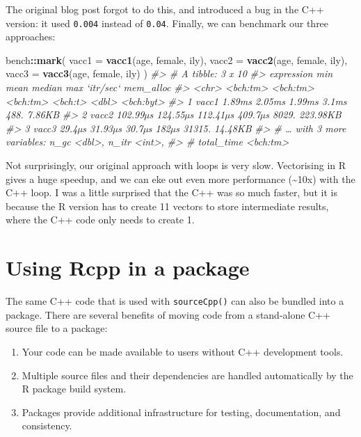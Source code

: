 \documentclass[]{book}
\newenvironment{Shaded}{\begin{snugshade}}{\end{snugshade}}
\newcommand{\CommentTok}[1]{\textcolor[rgb]{0.37,0.37,0.37}{\textit{#1}}}
\newcommand{\DataTypeTok}[1]{\textcolor[rgb]{0.27,0.27,0.27}{#1}}
\newcommand{\KeywordTok}[1]{\textcolor[rgb]{0.27,0.27,0.27}{\textbf{#1}}}
\newcommand{\NormalTok}[1]{#1}
\newcommand{\OperatorTok}[1]{\textcolor[rgb]{0.43,0.43,0.43}{\textbf{#1}}}
\begin{document}
The original blog post forgot to do this, and introduced a bug in the C++ version: it used \texttt{0.004} instead of \texttt{0.04}. Finally, we can benchmark our three approaches:

\begin{Shaded}
\begin{Highlighting}[]
\NormalTok{bench}\OperatorTok{::}\KeywordTok{mark}\NormalTok{(}
  \DataTypeTok{vacc1 =} \KeywordTok{vacc1}\NormalTok{(age, female, ily),}
  \DataTypeTok{vacc2 =} \KeywordTok{vacc2}\NormalTok{(age, female, ily),}
  \DataTypeTok{vacc3 =} \KeywordTok{vacc3}\NormalTok{(age, female, ily)}
\NormalTok{)}
\CommentTok{#> # A tibble: 3 x 10}
\CommentTok{#>   expression      min     mean   median     max `itr/sec` mem_alloc}
\CommentTok{#>   <chr>      <bch:tm> <bch:tm> <bch:tm> <bch:t>     <dbl> <bch:byt>}
\CommentTok{#> 1 vacc1        1.89ms   2.05ms   1.99ms   3.1ms      488.    7.86KB}
\CommentTok{#> 2 vacc2      102.99µs 124.55µs 112.41µs 409.7µs     8029.  223.98KB}
\CommentTok{#> 3 vacc3        29.4µs  31.93µs   30.7µs   182µs    31315.   14.48KB}
\CommentTok{#> # … with 3 more variables: n_gc <dbl>, n_itr <int>,}
\CommentTok{#> #   total_time <bch:tm>}
\end{Highlighting}
\end{Shaded}

Not surprisingly, our original approach with loops is very slow. Vectorising in R gives a huge speedup, and we can eke out even more performance (\textasciitilde{}10x) with the C++ loop. I was a little surprised that the C++ was so much faster, but it is because the R version has to create 11 vectors to store intermediate results, where the C++ code only needs to create 1.

\hypertarget{rcpp-package}{%
\section{Using Rcpp in a package}\label{rcpp-package}}

The same C++ code that is used with \texttt{sourceCpp()} can also be bundled into a package. There are several benefits of moving code from a stand-alone C++ source file to a package: 

\begin{enumerate}
\def\labelenumi{\arabic{enumi}.}
\item
  Your code can be made available to users without C++ development tools.
\item
  Multiple source files and their dependencies are handled automatically by
  the R package build system.
\item
  Packages provide additional infrastructure for testing, documentation, and
  consistency.
\end{enumerate}
\end{document}
